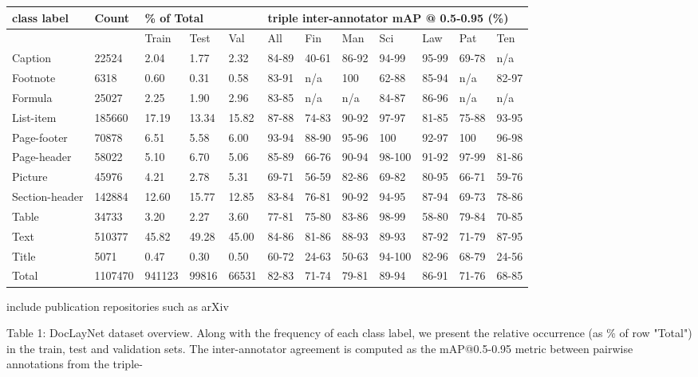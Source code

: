 \documentclass[11pt,a4paper]{article}
\begin{document}
\begin{table}[h]
\begin{tabular}{llllllllllll}
\toprule
\multirow{2}{*}{class label} & \multirow{2}{*}{Count} & \multicolumn{3}{l}{\% of Total} & \multicolumn{7}{l}{triple inter-annotator mAP @ 0.5-0.95 (\%)} \\
\midrule
 &  & Train & Test & Val & All & Fin & Man & Sci & Law & Pat & Ten \\
Caption & 22524 & 2.04 & 1.77 & 2.32 & 84-89 & 40-61 & 86-92 & 94-99 & 95-99 & 69-78 & n/a \\
Footnote & 6318 & 0.60 & 0.31 & 0.58 & 83-91 & n/a & 100 & 62-88 & 85-94 & n/a & 82-97 \\
Formula & 25027 & 2.25 & 1.90 & 2.96 & 83-85 & n/a & n/a & 84-87 & 86-96 & n/a & n/a \\
List-item & 185660 & 17.19 & 13.34 & 15.82 & 87-88 & 74-83 & 90-92 & 97-97 & 81-85 & 75-88 & 93-95 \\
Page-footer & 70878 & 6.51 & 5.58 & 6.00 & 93-94 & 88-90 & 95-96 & 100 & 92-97 & 100 & 96-98 \\
Page-header & 58022 & 5.10 & 6.70 & 5.06 & 85-89 & 66-76 & 90-94 & 98-100 & 91-92 & 97-99 & 81-86 \\
Picture & 45976 & 4.21 & 2.78 & 5.31 & 69-71 & 56-59 & 82-86 & 69-82 & 80-95 & 66-71 & 59-76 \\
Section-header & 142884 & 12.60 & 15.77 & 12.85 & 83-84 & 76-81 & 90-92 & 94-95 & 87-94 & 69-73 & 78-86 \\
Table & 34733 & 3.20 & 2.27 & 3.60 & 77-81 & 75-80 & 83-86 & 98-99 & 58-80 & 79-84 & 70-85 \\
Text & 510377 & 45.82 & 49.28 & 45.00 & 84-86 & 81-86 & 88-93 & 89-93 & 87-92 & 71-79 & 87-95 \\
Title & 5071 & 0.47 & 0.30 & 0.50 & 60-72 & 24-63 & 50-63 & 94-100 & 82-96 & 68-79 & 24-56 \\
Total & 1107470 & 941123 & 99816 & 66531 & 82-83 & 71-74 & 79-81 & 89-94 & 86-91 & 71-76 & 68-85 \\
\bottomrule
\end{tabular}
\end{table}

\begin{figure}[h]
\end{figure}

include publication repositories such as arXiv

Table 1: DocLayNet dataset overview. Along with the frequency of each class label, we present the relative occurrence (as \% of row "Total") in the train, test and validation sets. The inter-annotator agreement is computed as the mAP@0.5-0.95 metric between pairwise annotations from the triple-
\end{document}
